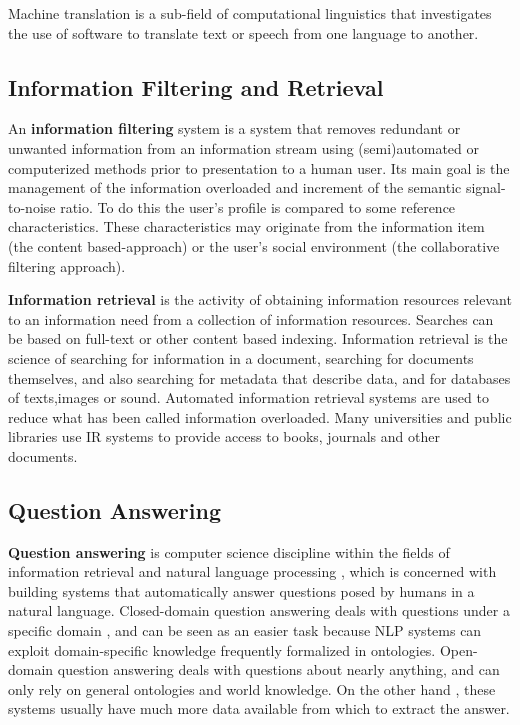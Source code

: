 \documentclass{article}
\begin{document}
Machine translation is a sub-field of computational linguistics that investigates the use of software to translate text or speech from one language to another.

\subsection{Information Filtering and Retrieval}

An \textbf{information filtering} system is a system that removes redundant or unwanted information from an information stream using (semi)automated or computerized methods prior to presentation to a human user. Its main goal is the management of the information overloaded and increment of the semantic signal-to-noise ratio. To do this the user's profile is compared to some reference characteristics. These characteristics may originate from the information item (the content based-approach) or the user's social environment (the collaborative filtering approach).

\textbf{Information retrieval} is the activity of obtaining information resources relevant to an information need from a collection of information resources. Searches can be based on full-text or other content based indexing. Information retrieval is the science of searching for information in a document, searching for documents themselves, and also searching for metadata that describe data, and for databases of texts,images or sound.
Automated information retrieval systems are used to reduce what has been called information overloaded. Many universities and public libraries use IR systems to provide access to books, journals and other documents.

\subsection{Question Answering}

\textbf{Question answering} is computer science discipline within the fields of information retrieval and natural language processing , which is concerned with building systems that automatically answer questions posed by humans in a natural language.
Closed-domain question answering deals with questions under a specific domain , and can be seen as an easier task because NLP systems can exploit domain-specific knowledge frequently formalized in ontologies.
Open-domain question answering deals with questions about nearly anything, and can only rely on general ontologies and world knowledge. On the other hand , these systems usually have much more data available from which to extract the answer.
\end{document}
